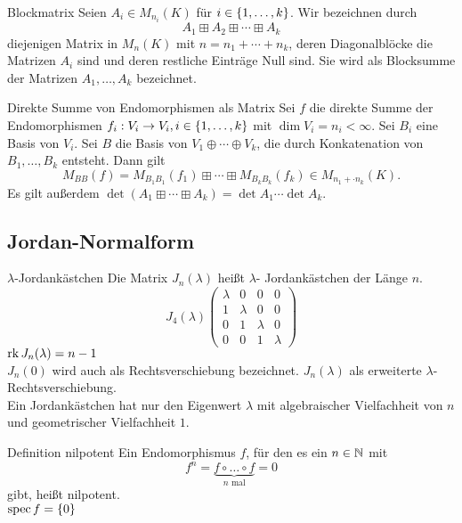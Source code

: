 \documentclass[main.tex]{subfiles}
\begin{document}
\begin{karte}{Blockmatrix}
    Seien \( A_i \in M_{n_i}(K) \) für \( i\in \{1,\ldots,k\} \). 
    Wir bezeichnen durch 
    \[ A_1 \boxplus A_2 \boxplus \cdots \boxplus A_k \] 
    diejenigen Matrix in \( M_n(K) \) mit \( n=n_1 + \cdots + n_k \), 
    deren Diagonalblöcke die Matrizen \( A_i \) sind und deren restliche 
    Einträge Null sind. Sie wird als Blocksumme der Matrizen 
    \( A_1, \ldots, A_k \) bezeichnet.
\end{karte}

\begin{karte}{Direkte Summe von Endomorphismen als Matrix}
    Sei \( f \) die direkte Summe der Endomorphismen 
    \( f_i : V_i \rightarrow V_i, i\in \{1,\ldots, k\} \) 
    mit \( \dim V_i = n_i < \infty \). Sei \( B_i \) 
    eine Basis von \( V_i \). Sei \(B\) die Basis von 
    \( V_1 \oplus \cdots \oplus V_k \), die durch 
    Konkatenation von \( B_1, \ldots, B_k \) entsteht. 
    Dann gilt 
    \[ M_{BB}(f) = M_{B_1B_1}(f_1) \boxplus \cdots \boxplus M_{B_k B_k}(f_k)
    \in M_{ n_1 + \cdot n_k }(K). \]
    Es gilt außerdem \( \det (A_1 \boxplus \cdots \boxplus A_k) = \det A_1 \cdots \det A_k \).
\end{karte}

\subsection*{Jordan-Normalform}

\begin{karte}{\(\lambda\)-Jordankästchen}
    Die Matrix \(J_n(\lambda)\) heißt \(\lambda\)- Jordankästchen der
    Länge \(n\).
    \[J_4(\lambda)\begin{pmatrix}
        \lambda &0 &0 &0\\
        1 &\lambda & 0 &0\\
        0 &1 &\lambda &0\\
        0 &0 &1 &\lambda
    \end{pmatrix}\]
    \(\operatorname{rk} J_n(\lambda) = n-1\)\\
    \(J_n(0)\) wird auch als Rechtsverschiebung bezeichnet. \(J_n(\lambda)\)
    als erweiterte \(\lambda\)-Rechtsverschiebung.\\
    Ein Jordankästchen hat nur den Eigenwert \(\lambda\) mit algebraischer Vielfachheit
    von \(n\) und geometrischer Vielfachheit \(1\).
\end{karte}

\begin{karte}{Definition nilpotent}
    Ein Endomorphismus \(f\), für den es ein \(n \in \mathbb{N}\) mit
    \[ f^n = \underbrace{f \circ \ldots \circ f}_{n \text{ mal}} = 0 \]
    gibt, heißt nilpotent.\\
    \(\operatorname{spec} f = \{0\}\)
\end{karte}
\end{document}
